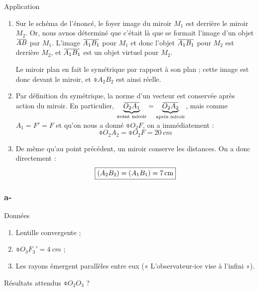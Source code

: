 \documentclass[10pt,a5paper,notitlepage]{book}
\begin{document}
\begin{NCexem}{Application}
    \begin{enumerate}
        \item Sur le schéma de l'énoncé, le foyer image du miroir $M_1$ est
            derrière le miroir $M_2$. Or, nous avnos déterminé que c'était là
            que se formait l'image d'un objet $\ABb$ par $M_1$. L'image $\ABa$
            pour $M_1$ et donc l'objet $\ABa$ pour $M_2$ est derrière $M_2$, et
            $\ABa$ est un objet virtuel pour $M_2$.

            Le miroir plan en fait le symétrique par rapport à son plan ;
            cette image est donc devant le miroir, et $\obar{A_2B_2}$ est ainsi
            réelle.

        \item Par définition du symétrique, la norme d'un vecteur est conservée
            après action du miroir. En particulier,
            $\underbrace{\obar{O_2A_1}}\St{avant miroir} =
            \underbrace{\obar{O_2A_2}}\St{après miroir}$, mais comme $A_1 = F' =
            F$ et qu'on nous a donné $\obar{O_2F}$, on a immédiatement :
            \[ \boxed{\obar{O_2A_2}= \obar{O_2F} = \SI{20}{cm}} \]

        \item De même qu'au point précédent, un miroir conserve les distances.
            On a donc directement :
            \[ \boxed{ \left(A_2B_2\right) = \left(A_1B_1\right) = \SI{7}{cm}} \]
    \end{enumerate}
\end{NCexem}

\subsubsection{a-}
\begin{NCdefi}{Données}
    \begin{enumerate}
        \item Lentille convergente ;
        \item $\obar{O_3F_3'} = \SI{4}{cm}$ ;
        \item Les rayons émergent parallèles entre eux (« L'observateur-ice vise
            à l'infini »).
    \end{enumerate}
\end{NCdefi}

\begin{NCprop}{Résultats attendus}
    $\obar{O_2O_3}$ ?
\end{NCprop}
\end{document}
